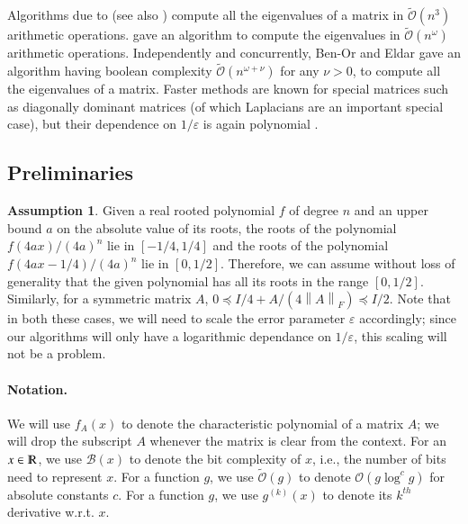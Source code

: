 \documentclass{article}[12pt]
\theoremstyle{definition}
\newtheorem{assumption}[theorem]{Assumption}
\renewcommand{\mathbb}{\varmathbb}
\newcommand{\paren}[1]{\left(#1 \right )}
\newcommand{\norm}[1]{\left\lVert#1\right\rVert}
\newcommand{\fnorm}[1]{\norm{#1}_F}
\newcommand{\R}{\mathbb R}
\newcommand{\e}{\epsilon}
\let\e\varepsilon
\newcommand{\cB}{\mathcal B}
\newcommand{\bigO}{\mathcal{O}}
\newcommand{\bigo}[1]{\bigO\left(#1\right)}
\newcommand{\tbigO}{\tilde{\mathcal{O}}}
\newcommand{\tbigo}[1]{\tbigO\left(#1\right)}
\newcommand{\charp}{f}
\newcommand{\bitcomp}[1]{\cB\paren{#1}}
\begin{document}
Algorithms due to \cite{pc99} (see also \cite{nh13}) compute all the eigenvalues of a matrix
in $\tbigo{n^3}$ arithmetic operations. \cite{ddh07} gave an algorithm to compute the eigenvalues
in $\tbigo{n^{\omega}}$ arithmetic operations.
Independently and concurrently, Ben-Or and Eldar \cite{be15} gave an algorithm
having boolean complexity $\tbigo{n^{\omega + \nu}}$ for any $\nu >0$,  
to compute all the eigenvalues of a matrix.
Faster methods are known for special matrices 
such as diagonally dominant matrices (of which Laplacians are an important special case), but their dependence 
on $1/\e$ is again polynomial \cite{v13}. 





\subsection{Preliminaries}
\label{sec:simpleass}
\begin{assumption}
\label{ass:root1}
Given a real rooted polynomial $f$ of degree $n$ and an upper bound $a$ on the absolute value of its roots, 
the roots of the polynomial $f(4ax)/(4a)^n$ lie in $[-1/4,1/4]$
and the roots of the polynomial $f(4ax -1/4 )/(4a)^n$ lie in $[0,1/2]$. 
Therefore, we can assume without loss of generality that the given polynomial has all its roots in the 
range $[0,1/2]$.
Similarly, for a symmetric matrix $A$, $0 \preceq I/4 + A/(4 \fnorm{A}) \preceq I/2$. 
Note that in both these cases, we will need to scale the error parameter $\e$ accordingly;
since our algorithms will only have a logarithmic dependance on $1/\e$, this scaling
will not be a problem.
\end{assumption}




\paragraph{Notation.}
We will use $\charp_A(x)$ to denote the characteristic polynomial of a matrix $A$;
we will drop the subscript $A$ whenever the matrix is clear from the context.
For an $x \in \R$, we use $\bitcomp{x}$ to denote the bit complexity of $x$, i.e., the number of 
bits need to represent $x$. 
For a function $g$, we use $\tbigo{g}$ to denote $\bigo{g \log^c g}$ for absolute constants $c$.
For a function $g$, we use $g^{(k)}(x)$ to denote its $k^{th}$ derivative w.r.t. $x$. 
\end{document}
